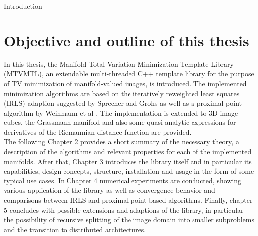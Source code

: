 \begin{chapter}{Introduction}
\section{Objective and outline of this thesis}
In this thesis, the Manifold Total Variation Minimization Template Library (MTVMTL), an extendable multi-threaded C++ template library for the purpose of TV minimization of manifold-valued images, is introduced. 
The implemented minimization algorithms are based on the iteratively reweighted least squares (IRLS) adaption suggested by Sprecher and Grohs \cite{SprecherIRLS} as well as a 
proximal point algorithm by Weinmann et al \cite{Weinmann}. The implementation is extended to 3D image cubes, the Grassmann manifold and also some quasi-analytic expressions for derivatives of the Riemannian distance function are provided.\\

The following Chapter 2 provides a short summary of the necessary theory, a description of the algorithms and relevant properties for each of the implemented manifolds.
After that, Chapter 3 introduces the library itself and in particular its capabilities, design concepts, structure, installation and usage in the form of some typical
use cases. In Chapter 4 numerical experiments are conducted, showing various application of the library as well as convergence behavior and comparisons between 
IRLS and proximal point based algorithms. Finally, chapter 5 concludes with possible extensions and adaptions of the library, in particular the possibility of recursive splitting of the image domain into smaller subproblems and
the transition to distributed architectures.
\end{chapter}
